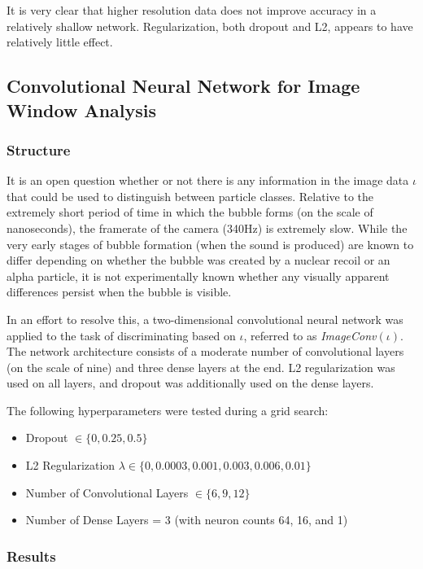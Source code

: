 \documentclass[10pt]{article}
\begin{document}
It is very clear that higher resolution data does not improve accuracy in a relatively shallow network. Regularization, both dropout and L2, appears to have relatively little effect.

\subsection{Convolutional Neural Network for Image Window Analysis}

\subsubsection{Structure}

It is an open question whether or not there is any information in the image data $\iota$ that could be used to distinguish between particle classes. Relative to the extremely short period of time in which the bubble forms (on the scale of nanoseconds), the framerate of the camera (340Hz) is extremely slow. While the very early stages of bubble formation (when the sound is produced) are known to differ depending on whether the bubble was created by a nuclear recoil or an alpha particle, it is not experimentally known whether any visually apparent differences persist when the bubble is visible.

In an effort to resolve this, a two-dimensional convolutional neural network was applied to the task of discriminating based on $\iota$, referred to as {\it ImageConv}$(\iota)$. The network architecture consists of a moderate number of convolutional layers (on the scale of nine) and three dense layers at the end. L2 regularization was used on all layers, and dropout was additionally used on the dense layers.

The following hyperparameters were tested during a grid search:
\begin{itemize}
    \item Dropout $\in \{0, 0.25, 0.5\}$
    \item L2 Regularization $\lambda \in \{0, 0.0003, 0.001, 0.003, 0.006, 0.01\}$
    \item Number of Convolutional Layers $\in \{6, 9, 12\}$
    \item Number of Dense Layers = 3 (with neuron counts 64, 16, and 1)
\end{itemize}

\subsubsection{Results}
\end{document}

